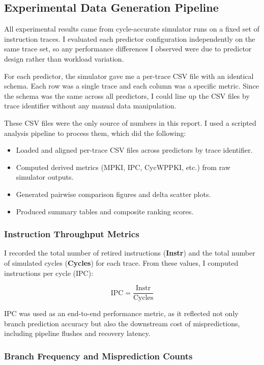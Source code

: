 \documentclass[11pt,a4paper]{article}
\begin{document}
\subsection{Experimental Data Generation Pipeline}

All experimental results came from cycle-accurate simulator runs on a fixed set of instruction
traces. I evaluated each predictor configuration independently on the same trace set, so any
performance differences I observed were due to predictor design rather than workload variation.

For each predictor, the simulator gave me a per-trace CSV file with an identical schema. Each
row was a single trace and each column was a specific metric. Since the schema was the same
across all predictors, I could line up the CSV files by trace identifier without any manual
data manipulation.

These CSV files were the only source of numbers in this report. I used a scripted analysis
pipeline to process them, which did the following:
\begin{itemize}
    \item Loaded and aligned per-trace CSV files across predictors by trace identifier.
    \item Computed derived metrics (MPKI, IPC, CycWPPKI, etc.) from raw simulator outputs.
    \item Generated pairwise comparison figures and delta scatter plots.
    \item Produced summary tables and composite ranking scores.
\end{itemize}


\subsubsection{Instruction Throughput Metrics}

I recorded the total number of retired instructions (\textbf{Instr}) and the total number of
simulated cycles (\textbf{Cycles}) for each trace. From these values, I computed instructions per
cycle (IPC):

\[
\text{IPC} = \frac{\text{Instr}}{\text{Cycles}}
\]

IPC was used as an end-to-end performance metric, as it reflected not only branch prediction
accuracy but also the downstream cost of mispredictions, including pipeline flushes and recovery
latency.

\subsubsection{Branch Frequency and Misprediction Counts}
\end{document}
